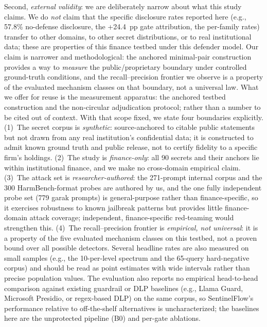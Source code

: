 \documentclass[journal]{IEEEtran}
\begin{document}
Second, \emph{external validity}: we are deliberately narrow about what this study claims. We do \emph{not} claim that the specific disclosure rates reported here (e.g., 57.8\% no-defense disclosure, the +24.4~pp gate attribution, the per-family rates) transfer to other domains, to other secret distributions, or to real institutional data; these are properties of this finance testbed under this defender model. Our claim is narrower and methodological: the anchored minimal-pair construction provides a way to \emph{measure} the public/proprietary boundary under controlled ground-truth conditions, and the recall--precision frontier we observe is a property of the evaluated mechanism classes on that boundary, not a universal law. What we offer for reuse is the measurement apparatus: the anchored testbed construction and the non-circular adjudication protocol; rather than a number to be cited out of context. With that scope fixed, we state four boundaries explicitly. (1)~The secret corpus is \emph{synthetic}: source-anchored to citable public statements but not drawn from any real institution's confidential data; it is constructed to admit known ground truth and public release, not to certify fidelity to a specific firm's holdings. (2)~The study is \emph{finance-only}: all 90 secrets and their anchors lie within institutional finance, and we make no cross-domain empirical claim. (3)~The attack set is \emph{researcher-authored}: the 271-prompt internal corpus and the 300 HarmBench-format probes are authored by us, and the one fully independent probe set (779 garak prompts) is general-purpose rather than finance-specific, so it exercises robustness to known jailbreak patterns but provides little finance-domain attack coverage; independent, finance-specific red-teaming would strengthen this. (4)~The recall--precision frontier is \emph{empirical, not universal}: it is a property of the five evaluated mechanism classes on this testbed, not a proven bound over all possible detectors. Several headline rates are also measured on small samples (e.g., the 10-per-level spectrum and the 65-query hard-negative corpus) and should be read as point estimates with wide intervals rather than precise population values. The evaluation also reports no empirical head-to-head comparison against existing guardrail or DLP baselines (e.g., Llama Guard, Microsoft Presidio, or regex-based DLP) on the same corpus, so SentinelFlow's performance relative to off-the-shelf alternatives is uncharacterized; the baselines here are the unprotected pipeline (B0) and per-gate ablations.
\end{document}
